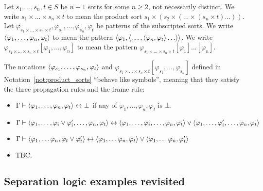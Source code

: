 \documentclass{amsart}
\begin{document}
\begin{notation}
\label{not:product_sorts}
Let $s_1,\dots,s_n, t\in S$ be $n+1$ sorts for some $n \ge 2$,
not necessarily distinct.
We write $s_1 \times \dots \times s_n \times t$ to mean the product sort
$s_1 \times 
(s_2 \times ( \dots \times (s_n \times t) \dots ))$.
Let $\varphi_{s_1 \times \dots \times s_n \times t},
\varphi_{s_1}, \dots, \varphi_{s_n},
\varphi_t$ be patterns of the subscripted sorts.
We write
$\langle \varphi_1,\dots,\varphi_n,\varphi_t \rangle$
to mean the pattern
$\la \varphi_1, \la \dots, \la \varphi_n,\varphi_t\ra  \dots\ra \ra$.
We write
$\varphi_{s_1 \times \dots \times s_n \times t}[\varphi_1,\dots,\varphi_n]$
to mean the pattern
$\varphi_{s_1 \times \dots \times s_n \times t}[\varphi_1]\dots[\varphi_n]$.
\end{notation}

\begin{proposition}
The notations $\langle \varphi_{s_1},\dots,\varphi_{s_n},\varphi_t \rangle$
and $\varphi_{s_1 \times \dots \times s_n \times 
t}[\varphi_{s_1},\dots,\varphi_{s_n}]$
defined in Notation~\ref{not:product_sorts}
``behave like symbols'', meaning that they satisfy
the three propagation rules and the frame rule:
\begin{itemize}
\item $\Gamma \vdash \langle \varphi_1,\dots,\varphi_n,\varphi_t\rangle  \leftrightarrow \bot$
if any of $\varphi_1,\dots,\varphi_n,\varphi_t$ is $\bot$.
\item $\Gamma \vdash \langle \varphi_1,\dots,\varphi_i \vee 
\varphi'_i,\dots,\varphi_n,\varphi_t\rangle  \leftrightarrow
\langle \varphi_1,\dots,\varphi_i,\dots,\varphi_n,\varphi_t\rangle 
\vee
\langle \varphi_1,\dots,\varphi'_i,\dots,\varphi_n,\varphi_t\rangle $
\item $\Gamma \vdash \langle \varphi_1,\dots\varphi_n,\varphi_t\vee \varphi'_t\rangle  
\leftrightarrow
\langle \varphi_1,\dots\varphi_n,\varphi_t\rangle  
\vee
\langle \varphi_1,\dots\varphi_n,\varphi'_t\rangle  $
\item TBC.
\end{itemize}
\end{proposition}

\subsection{Separation logic examples revisited}
\end{document}
